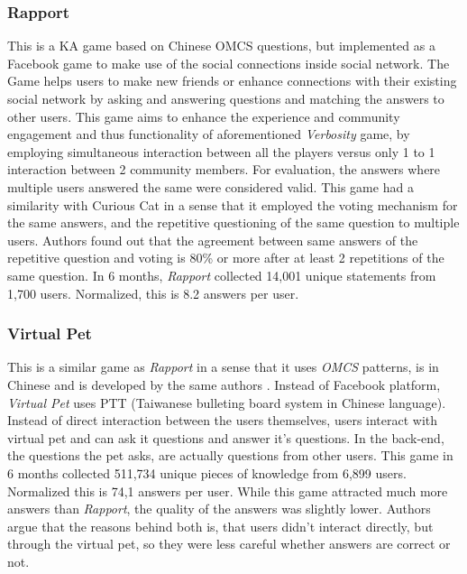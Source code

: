 \subsubsection{Rapport}
\label{section:r:rapport} 
This is a KA game based on Chinese OMCS questions, but implemented as a 
Facebook game to make use of the social connections inside social network. 
The Game helps users to make new friends or enhance connections with their 
existing social network by asking and answering questions and matching the 
answers to other users\parencite{Kuo2009}. This game aims to enhance the 
experience and community engagement and thus functionality of aforementioned 
\emph{Verbosity} game, by employing simultaneous  interaction between all the 
players versus only 1 to 1 interaction between 2 community members. For 
evaluation, the answers where multiple users answered the same were considered 
valid. This game had a similarity with Curious Cat in a sense that it employed
the voting mechanism for the same answers, and the repetitive questioning of
the same question to multiple users. Authors found out that the agreement 
between same answers of the repetitive question and voting is 80\% or more 
after at least 2 repetitions of the same question. In 6 months, \emph{Rapport}
collected 14,001 unique statements from 1,700 users. Normalized, this is
8.2 answers per user.

\subsubsection{Virtual Pet}
\label{section:r:virtualpet} 
This is a similar game as \emph{Rapport} in a sense that it
uses \emph{OMCS} patterns, is in Chinese and is developed by the same authors
\parencite{Kuo2009}. Instead of Facebook platform, \emph{Virtual Pet} uses
PTT (Taiwanese bulleting board system in Chinese language). Instead of direct
interaction between the users themselves, users interact with virtual pet and
can ask it questions and answer it's questions. In the back-end, the questions
the pet asks, are actually questions from other users. This game in 6 months 
collected 511,734 unique pieces of knowledge from 6,899 users. Normalized this
is 74,1 answers per user. While this game attracted much more answers than 
\emph{Rapport}, the quality of the answers was slightly lower. Authors
argue that the reasons behind both is, that users didn't interact directly,
but through the virtual pet, so they were less careful whether answers are
correct or not.

